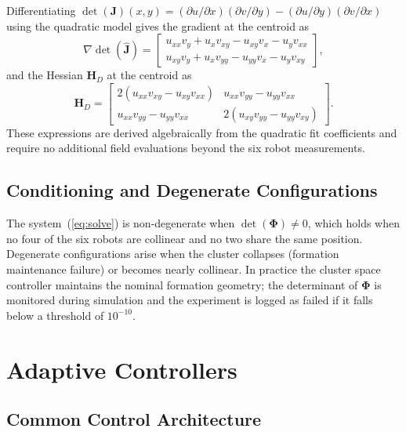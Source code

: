 \documentclass[lettersize,journal]{IEEEtran}
\begin{document}
Differentiating $\det(\mathbf{J})(x, y) = (\partial u / \partial x)(\partial v
/ \partial y) - (\partial u / \partial y)(\partial v / \partial x)$ using the
quadratic model gives the gradient at the centroid as
\begin{equation}
    \nabla\det(\hat{\mathbf{J}}) =
    \begin{bmatrix}
        u_{xx} v_y + u_x v_{xy} - u_{xy} v_x - u_y v_{xx} \\
        u_{xy} v_y + u_x v_{yy} - u_{yy} v_x - u_y v_{xy}
    \end{bmatrix}, \label{eq:grad_det}
\end{equation}
and the Hessian $\mathbf{H}_D$ at the centroid as
\begin{equation}
    \mathbf{H}_D =
    \begin{bmatrix}
        2(u_{xx} v_{xy} - u_{xy} v_{xx}) &
        u_{xx} v_{yy} - u_{yy} v_{xx} \\
        u_{xx} v_{yy} - u_{yy} v_{xx} &
        2(u_{xy} v_{yy} - u_{yy} v_{xy})
    \end{bmatrix}. \label{eq:hess_det}
\end{equation}
These expressions are derived algebraically from the quadratic fit coefficients
and require no additional field evaluations beyond the six robot measurements.

\subsection{Conditioning and Degenerate Configurations}

The system~(\ref{eq:solve}) is non-degenerate when $\det(\boldsymbol{\Phi})
\neq 0$, which holds when no four of the six robots are collinear and no two
share the same position. Degenerate configurations arise when the cluster
collapses (formation maintenance failure) or becomes nearly collinear. In
practice the cluster space controller maintains the nominal formation geometry;
the determinant of $\boldsymbol{\Phi}$ is monitored during simulation and the
experiment is logged as failed if it falls below a threshold of $10^{-10}$.


\section{Adaptive Controllers}
\label{sec:controllers}

\subsection{Common Control Architecture}
\label{sec:arch}
\end{document}
